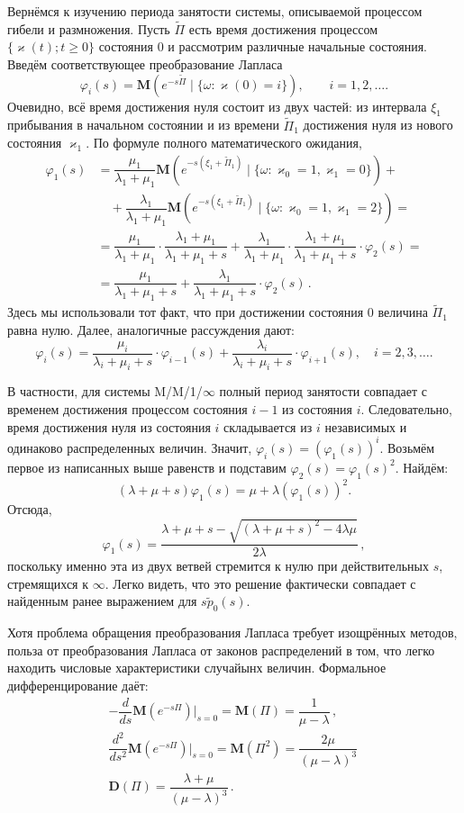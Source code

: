 \documentclass[12pt]{extarticle}
\newcommand{\M}{{\mathbf M}}
\newcommand{\D}{{\mathbf D}}
\begin{document}
Вернёмся к изучению периода занятости системы, описываемой процессом гибели и
размножения. Пусть $\tilde\Pi$ есть время достижения процессом $\{\varkappa(t);
t\geqslant0\}$ состояния $0$ и рассмотрим различные начальные состояния. Введём
соответствующее преобразование Лапласа
\[
\varphi_i(s)=\M(e^{-s\tilde\Pi}\mid\{\omega\colon \varkappa(0)=i\}), \qquad i=1,
2, \ldots.
\]
Очевидно, всё время достижения нуля состоит из двух частей: из интервала $\xi_1$
прибывания в начальном состоянии и из времени $\tilde\Pi_1$ достижения нуля из нового
состояния $\varkappa_1$. По формуле полного математического ожидания,
\begin{align*}
  \varphi_1(s)&= \dfrac{\mu_1}{\lambda_1+\mu_1}
  \M(e^{-s(\xi_1+\tilde\Pi_1)}\mid\{\omega\colon \varkappa_0=1, \varkappa_1=0\})
  +
  \\ & \quad 
  +\dfrac{\lambda_1}{\lambda_1+\mu_1}
  \M(e^{-s(\xi_1+\tilde\Pi_1)}\mid\{\omega\colon \varkappa_0=1,
  \varkappa_1=2\})=
  \\ & =
  \dfrac{\mu_1}{\lambda_1+\mu_1}\cdot
  \dfrac{\lambda_1+\mu_1}{\lambda_1+\mu_1+s}+
  \dfrac{\lambda_1}{\lambda_1+\mu_1}\cdot
  \dfrac{\lambda_1+\mu_1}{\lambda_1+\mu_1+s} \cdot \varphi_2(s)=
  \\ & =
  \dfrac{\mu_1}{\lambda_1+\mu_1+s}+
  \dfrac{\lambda_1}{\lambda_1+\mu_1+s} \cdot \varphi_2(s)\,. 
\end{align*}
Здесь мы использовали тот факт, что при достижении состояния $0$ величина
$\tilde\Pi_1$ равна нулю. Далее, аналогичные рассуждения дают:
\[
\varphi_i(s)=\dfrac{\mu_i}{\lambda_i+\mu_i+s} \cdot \varphi_{i-1}(s)+
\dfrac{\lambda_i}{\lambda_i+\mu_i+s} \cdot \varphi_{i+1}(s),\quad i=2, 3, \ldots{}.
\]

В частности, для системы M/M/1/$\infty$ полный период занятости совпадает с
временем достижения процессом состояния $i-1$ из состояния $i$. Следовательно,
время достижения нуля из состояния $i$ складывается из $i$ независимых и
одинаково распределенных величин. Значит,
$\varphi_i(s)=(\varphi_1(s))^i$. Возьмём первое из написанных выше равенств и
подставим $\varphi_2(s)=\varphi_1(s)^2$. Найдём:
\[
(\lambda+\mu+s)\varphi_1(s)= \mu + \lambda (\varphi_1(s))^2.
\]
Отсюда,
\[
\varphi_1(s)=\dfrac{\lambda+\mu+s-\sqrt{(\lambda+\mu+s)^2-4\lambda\mu}}{2\lambda}\,,
\]
поскольку именно эта из двух ветвей стремится к нулю при действительных $s$,
стремящихся к $\infty$. Легко видеть, что это решение фактически совпадает с
найденным ранее выражением для $s\tilde p_0(s)$. 

Хотя проблема обращения преобразования Лапласа требует изощрённых методов,
польза от преобразования Лапласа от законов распределений в том, что легко
находить числовые характеристики случайынх величин. Формальное дифференцирование
даёт:
\begin{gather*}
  -\dfrac{d}{ds}\M(e^{-s\Pi})
  \Big|_{s=0}=\M(\Pi)=\dfrac{1}{\mu-\lambda}\,,\\
  \dfrac{d^2}{ds^2}\M(e^{-s\Pi})
  \Big|_{s=0}=\M(\Pi^2)=\dfrac{2\mu}{(\mu-\lambda)^3}\,\\
  \D(\Pi)=\dfrac{\lambda+\mu}{(\mu-\lambda)^3}\,.
\end{gather*}
\end{document}
